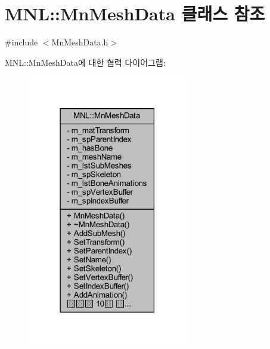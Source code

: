 \hypertarget{class_m_n_l_1_1_mn_mesh_data}{}\section{M\+NL\+:\+:Mn\+Mesh\+Data 클래스 참조}
\label{class_m_n_l_1_1_mn_mesh_data}


{\ttfamily \#include $<$Mn\+Mesh\+Data.\+h$>$}



M\+NL\+:\+:Mn\+Mesh\+Data에 대한 협력 다이어그램\+:\nopagebreak
\begin{figure}[H]
\begin{center}
\leavevmode
\includegraphics[width=198pt]{class_m_n_l_1_1_mn_mesh_data__coll__graph}
\end{center}
\end{figure}
